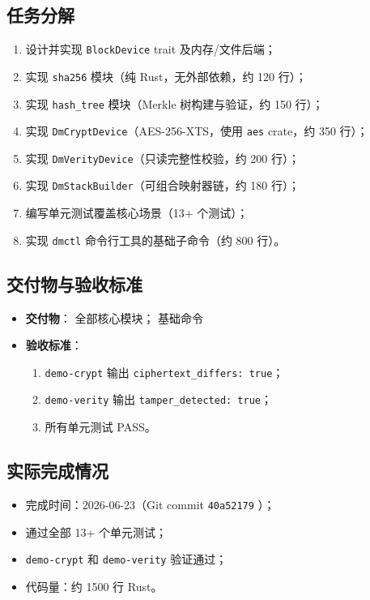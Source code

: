 \subsection{任务分解}
\begin{enumerate}
    \item 设计并实现 \texttt{BlockDevice} trait 及内存/文件后端；
    \item 实现 \texttt{sha256} 模块（纯 Rust，无外部依赖，约 120 行）；
    \item 实现 \texttt{hash\_tree} 模块（Merkle 树构建与验证，约 150 行）；
    \item 实现 \texttt{DmCryptDevice}（AES-256-XTS，使用 \texttt{aes} crate，约 350 行）；
    \item 实现 \texttt{DmVerityDevice}（只读完整性校验，约 200 行）；
    \item 实现 \texttt{DmStackBuilder}（可组合映射器链，约 180 行）；
    \item 编写单元测试覆盖核心场景（13+ 个测试）；
    \item 实现 \texttt{dmctl} 命令行工具的基础子命令（约 800 行）。
\end{enumerate}

\subsection{交付物与验收标准}
\begin{itemize}
    \item \textbf{交付物}：\texttt{} 全部核心模块；\texttt{} 基础命令
    \item \textbf{验收标准}：
    \begin{enumerate}
        \item \texttt{demo-crypt} 输出 \texttt{ciphertext\_differs: true}；
        \item \texttt{demo-verity} 输出 \texttt{tamper\_detected: true}；
        \item 所有单元测试 PASS。
    \end{enumerate}
\end{itemize}

\subsection{实际完成情况}
\begin{itemize}
    \item 完成时间：2026-06-23（Git commit \texttt{40a52179} \texttt{}）；
    \item 通过全部 13+ 个单元测试；
    \item \texttt{demo-crypt} 和 \texttt{demo-verity} 验证通过；
    \item 代码量：约 1500 行 Rust。
\end{itemize}

